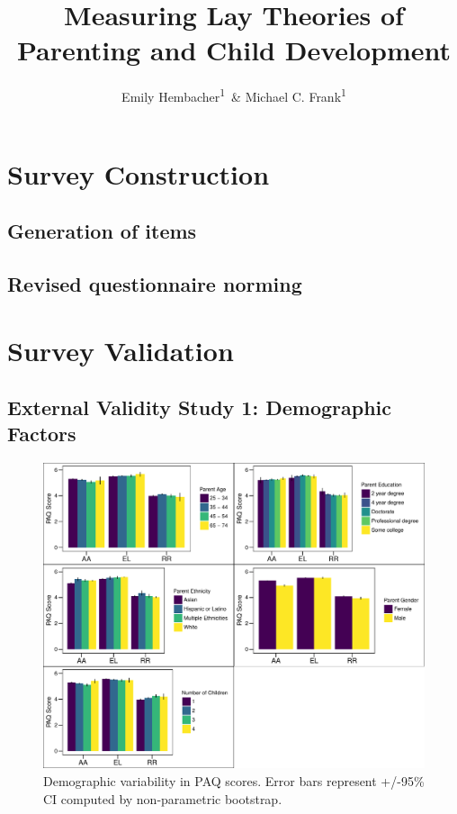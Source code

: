 \documentclass[floatsintext,man]{apa6}
\title{Measuring Lay Theories of Parenting and Child Development}
\author{Emily Hembacher\textsuperscript{1}~\& Michael C. Frank\textsuperscript{1}}
\affiliation{
    \vspace{0.5cm}
          \textsuperscript{1} Stanford University  }
\theoremstyle{definition}
\theoremstyle{definition}
\theoremstyle{definition}
\theoremstyle{remark}
\begin{document}
\maketitle

\setcounter{secnumdepth}{0}



\section{Survey Construction}\label{survey-construction}

\subsection{Generation of items}\label{generation-of-items}

\subsection{Revised questionnaire
norming}\label{revised-questionnaire-norming}

\section{Survey Validation}\label{survey-validation}

\subsection{External Validity Study 1: Demographic
Factors}\label{external-validity-study-1-demographic-factors}

\begin{figure}
\centering
\includegraphics{PAQ_paper_files/figure-latex/demographics-1.pdf}
\caption{\label{fig:demographics}Demographic variability in PAQ scores.
Error bars represent +/-95\% CI computed by non-parametric bootstrap.}
\end{figure}
\end{document}
